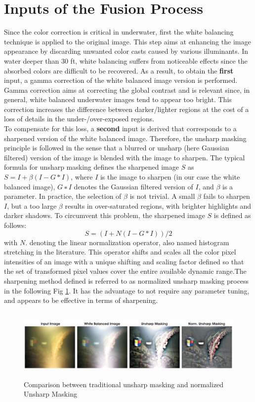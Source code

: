 \documentclass[hidelinks, 12pt]{report}
\begin{document}
\section{Inputs of the Fusion Process}
Since the color correction is critical in underwater, first the white balancing technique is applied to the original image. This step aims at enhancing the image appearance by discarding unwanted color casts caused by various illuminants. In water deeper than 30 ft, white balancing suffers from noticeable effects since the absorbed colors are difficult to be recovered. As a result, to obtain the \textbf{first} input, a gamma correction of the white balanced image version is performed. Gamma correction aims at correcting the global contrast and is relevant since, in general, white balanced underwater images tend to appear too bright. This correction increases the difference between darker/lighter regions at the cost of a loss of details in the under-/over-exposed regions.\\ To compensate for this loss, a \textbf{second} input is derived that corresponds to a sharpened version of the white balanced image. Therefore, the unsharp masking principle is followed in the sense that a blurred or unsharp (here Gaussian filtered) version of the image is blended with the image to sharpen. The typical formula for unsharp masking defines the sharpened image $S$ as $S=I+\beta(I-G*I)$, where $I$ is the image to sharpen (in our case the white balanced image), $G∗I$ denotes the Gaussian filtered version of $I$, and $\beta$ is a parameter. In practice, the selection of $\beta$ is not trivial. A small $\beta$ fails to sharpen $I$, but a too large $\beta$ results in over-saturated regions, with brighter highlights and darker shadows. To circumvent this problem, the sharpened image $S$ is defined as follows:
\begin{equation}
S=(I+N(I-G*I))/2
\end{equation}
with $N{.}$ denoting the linear normalization operator, also named histogram stretching in the literature. This operator shifts and scales all the color pixel intensities of an image with a unique shifting and scaling factor defined so that the set of transformed pixel values cover the entire available dynamic range.The sharpening method defined is referred to as normalized unsharp masking process in the following Fig \ref{Masking}. It has the advantage to not require any parameter tuning, and appears to be effective in terms of sharpening. 
\begin{figure}[H]
\centering
\includegraphics[width=15cm,height=3.5cm]{NUM.png}
\caption[Comparison between traditional Unsharp Masking and normalized Unsharp Masking]{Comparison between traditional unsharp masking and normalized Unsharp Masking}
\label{Masking}
\end{figure}
\end{document}
